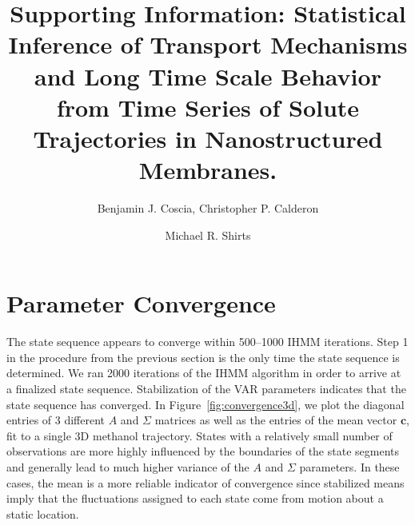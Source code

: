 \documentclass{article}
\title{Supporting Information: Statistical Inference of Transport Mechanisms and Long Time Scale Behavior from Time Series 
       of Solute Trajectories in Nanostructured Membranes.}
\author{Benjamin J. Coscia, Christopher P. Calderon \and Michael R. Shirts}
\begin{document}
  \graphicspath{{./supporting_figures/}}
  \maketitle
  
  \section{Parameter Convergence}\label{section:convergence}
  
  The state sequence appears to converge within 500--1000 IHMM iterations. Step 1
  in the procedure from the previous section is the only time the state sequence 
  is determined. We ran 2000 iterations of the IHMM algorithm in order to arrive
  at a finalized state sequence. Stabilization of the VAR parameters indicates 
  that the state sequence has converged. In Figure~\ref{fig:convergence3d}, we plot
  the diagonal entries of 3 different $A$ and $\Sigma$ matrices as well as the 
  entries of the mean vector $\mathbf{c}$, fit to a single 3D methanol trajectory.
  States with a relatively small number of observations are more highly influenced 
  by the boundaries of the state segments and generally lead to much higher 
  variance of the $A$ and $\Sigma$ parameters. In these cases, the mean is
  a more reliable indicator of convergence since stabilized means imply that the
  fluctuations assigned to each state come from motion about a static location.
  
\end{document}
